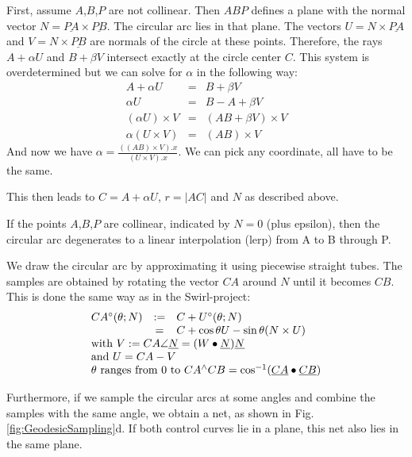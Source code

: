 \documentclass[journal, letterpaper]{IEEEtran}
\begin{document}
First, assume $A$,$B$,$P$ are not collinear. Then $ABP$ defines a plane with the normal vector $N=\underline{PA} \times \underline{PB}$. The circular arc lies in that plane. The vectors $U=N \times \underline{PA}$ and $V=N \times \underline{PB}$ are normals of the circle at these points.
Therefore, the rays $A+\alpha U$ and $B+\beta V$ intersect exactly at the circle center $C$.
This system is overdetermined but we can solve for $\alpha$ in the following way:
\begin{equation}
\begin{array}{rcl}
A + \alpha U &=& B + \beta V \\
\alpha U &=& B-A+\beta V \\
(\alpha U) \times V &=& (AB+\beta V) \times V \\
\alpha (U\times V) &=& (AB) \times V
\end{array}
\label{eq:CircArc}
\end{equation}
And now we have $\alpha = \frac{ ((AB)\times V).x }{ (U \times V).x}$. We can pick any coordinate, all have to be the same.

This then leads to $C=A + \alpha U$, $r=|AC|$ and $N$ as described above.

If the points $A$,$B$,$P$ are collinear, indicated by $N=0$ (plus epsilon), then the circular arc degenerates to a linear interpolation (lerp) from A to B through P.

We draw the circular arc by approximating it using piecewise straight tubes. The samples are obtained by rotating the vector $CA$ around $N$ until it becomes $CB$. This is done the same way as in the Swirl-project:
\begin{equation}
\begin{array}{lcl}
 CA^{\circ}(\theta; N) &:=& C + U^{\circ}(\theta; N) \\
                        & =& C + \cos \theta U - \sin \theta (N \times U)\\
 \multicolumn{3}{l}{\text{with } V := CA\angle\underline{N} = (W\bullet\underline{N})\underline{N}} \\
 \multicolumn{3}{l}{\text{and } U = CA-V} \\
 \multicolumn{3}{l}{\theta \text{ ranges from } 0 \text{ to } CA^{\wedge}CB=\cos^{-1}(\underline{CA}\bullet\underline{CB})}
\end{array}
\label{eq:Rot}
\end{equation}

Furthermore, if we sample the circular arcs at some angles and combine the samples with the same angle, we obtain a net, as shown in Fig.\ref{fig:GeodesicSampling}d. If both control curves lie in a plane, this net also lies in the same plane.
\end{document}
